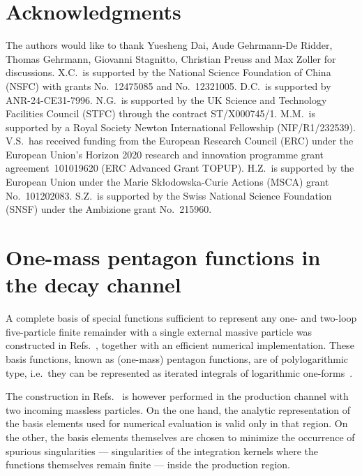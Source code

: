 \documentclass[10pt,aps,prl,superscriptaddress,twocolumn,preprintnumbers,nofootinbib]{revtex4-2}
\begin{document}
\section{Acknowledgments}
\begin{acknowledgments}
The authors would like to thank Yuesheng Dai, Aude Gehrmann-De Ridder, Thomas Gehrmann, Giovanni Stagnitto, Christian Preuss and Max Zoller for discussions.
X.C.\ is supported by the National Science Foundation of China (NSFC) with grants No.~12475085 and No.~12321005.
D.C.\ is supported by ANR-24-CE31-7996.
N.G.\ is supported by the UK Science and Technology Facilities Council (STFC) through the contract ST/X000745/1.
M.M.\ is supported by a Royal Society Newton International Fellowship (NIF/R1/232539).
V.S.\ has received funding from the European Research Council (ERC) under the European Union’s Horizon 2020 research and innovation programme grant agreement~101019620 (ERC Advanced Grant TOPUP).
H.Z.\ is supported by the European Union under the Marie Sk{\l}odowska-Curie Actions (MSCA) grant No.~101202083.
S.Z.\ is supported by the Swiss National Science Foundation (SNSF) under the Ambizione grant No.~215960.
\end{acknowledgments}




\appendix

\section{One-mass pentagon functions in the decay channel}
\label{sec:pentagon-functions}

A complete basis of special functions sufficient to represent any one- and two-loop five-particle finite remainder with a single external massive particle was constructed in Refs.~\cite{Chicherin:2021dyp,Abreu:2023rco}, together with an efficient numerical implementation.
These basis functions, known as (one-mass) pentagon functions, are of polylogarithmic type, i.e.~they can be represented as iterated integrals of logarithmic one-forms~\cite{Abreu:2022mfk}.

The construction in Refs.~\cite{Chicherin:2021dyp,Abreu:2023rco} is however performed in the production channel with two incoming massless particles.
On the one hand, the analytic representation of the basis elements used for numerical evaluation is valid only in that region.
On the other, the basis elements themselves are chosen to minimize the occurrence of spurious singularities --- singularities of the integration kernels where the functions themselves remain finite --- inside the production region.
\end{document}
